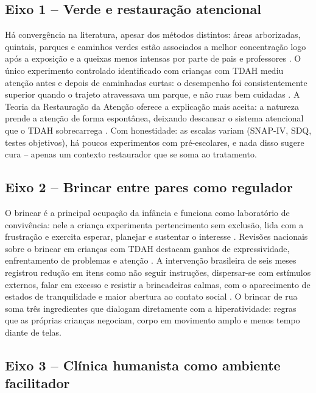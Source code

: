 \subsection{Eixo 1 -- Verde e restaura\c{c}\~ao atencional}

H\'a converg\^encia na literatura, apesar dos m\'etodos distintos: \'areas arborizadas, quintais, parques e caminhos verdes est\~ao associados a melhor concentra\c{c}\~ao logo ap\'os a exposi\c{c}\~ao e a queixas menos intensas por parte de pais e professores \cite{hood2024,yang2019}. O \'unico experimento controlado identificado com crian\c{c}as com TDAH mediu aten\c{c}\~ao antes e depois de caminhadas curtas: o desempenho foi consistentemente superior quando o trajeto atravessava um parque, e n\~ao ruas bem cuidadas \cite{fabertaylor2009}. A Teoria da Restaura\c{c}\~ao da Aten\c{c}\~ao oferece a explica\c{c}\~ao mais aceita: a natureza prende a aten\c{c}\~ao de forma espont\^anea, deixando descansar o sistema atencional que o TDAH sobrecarrega \cite{kuo2004,taylor2011}. Com honestidade: as escalas variam (SNAP-IV, SDQ, testes objetivos), h\'a poucos experimentos com pr\'e-escolares, e nada disso sugere cura -- apenas um contexto restaurador que se soma ao tratamento.

\subsection{Eixo 2 -- Brincar entre pares como regulador}

O brincar \'e a principal ocupa\c{c}\~ao da inf\^ancia e funciona como laborat\'orio de conviv\^encia: nele a crian\c{c}a experimenta pertencimento sem exclus\~ao, lida com a frustra\c{c}\~ao e exercita esperar, planejar e sustentar o interesse \cite{figueiredo2015}. Revis\~oes nacionais sobre o brincar em crian\c{c}as com TDAH destacam ganhos de expressividade, enfrentamento de problemas e aten\c{c}\~ao \cite{damascenoeduc2025}. A interven\c{c}\~ao brasileira de seis meses registrou redu\c{c}\~ao em itens como n\~ao seguir instru\c{c}\~oes, dispersar-se com est\'imulos externos, falar em excesso e resistir a brincadeiras calmas, com o aparecimento de estados de tranquilidade e maior abertura ao contato social \cite{damasceno2025}. O brincar de rua soma tr\^es ingredientes que dialogam diretamente com a hiperatividade: regras que as pr\'oprias crian\c{c}as negociam, corpo em movimento amplo e menos tempo diante de telas.

\subsection{Eixo 3 -- Cl\'inica humanista como ambiente facilitador}

